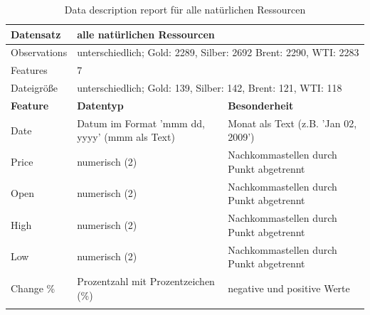 \begin{centering} \begin{longtable}[!h]{|p{5cm}|p{4cm}|p{5cm}|}
\hline
Datensatz & \multicolumn{2}{l|}{alle natürlichen Ressourcen} \\ \hline
Observations & \multicolumn{2}{p{9cm}|}{unterschiedlich; Gold: 2289, Silber: 2692 Brent: 2290, WTI: 2283}\\ \hline
Features & \multicolumn{2}{l|}{7} \\ \hline
Dateigröße & \multicolumn{2}{l|}{unterschiedlich; Gold: 139, Silber: 142, Brent: 121, WTI: 118} \\ \hline
\hhline{===}
\textbf{Feature} & \textbf{Datentyp} & \textbf{Besonderheit}\\ 
\hhline{===}
Date & Datum im Format 'mmm dd, yyyy' (mmm als Text) & Monat als Text (z.B. 'Jan 02, 2009') \\ \hline
Price & numerisch (2) & Nachkommastellen durch Punkt abgetrennt \\ \hline 
Open &  numerisch (2) & Nachkommastellen durch Punkt abgetrennt \\ \hline 
High &  numerisch (2) & Nachkommastellen durch Punkt abgetrennt \\ \hline 
Low &  numerisch (2) & Nachkommastellen durch Punkt abgetrennt \\ \hline 
Change \% & Prozentzahl mit Prozentzeichen (\%) & negative und positive Werte \\ \hline
\caption{Data description report für alle natürlichen Ressourcen}
\end{longtable} \end{centering}
